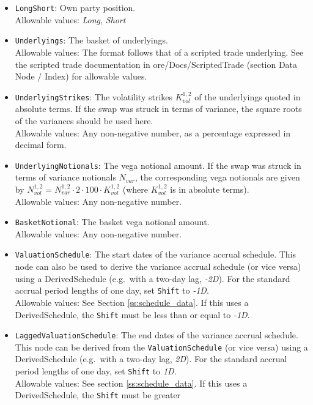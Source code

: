 \begin{itemize}
  \item \lstinline!LongShort!: Own party position. \\
    Allowable values: \emph{Long}, \emph{Short}
  \item \lstinline!Underlyings!: The basket of underlyings. \\
    Allowable values: The format follows that of a scripted trade underlying. See the scripted trade documentation in
    ore/Docs/ScriptedTrade (section Data Node / Index) for allowable values.
  \item \lstinline!UnderlyingStrikes!: The volatility strikes $K^{1,2}_{vol}$ of the underlyings quoted in absolute terms.
  If the swap was struck in terms of variance, the square roots of the variances should be used here. \\
    Allowable values: Any non-negative number, as a percentage expressed in decimal form.
  \item \lstinline!UnderlyingNotionals!: The vega notional amount. If the swap was struck in terms of variance notionals
  $N_{var}$, the corresponding vega notionals are given by $N^{1,2}_{vol} = N^{1,2}_{var} \cdot 2 \cdot 100 \cdot K^{1,2}_{vol}$
  (where $K^{1,2}_{vol}$ is in absolute terms). \\
    Allowable values: Any non-negative number. 
  \item{} \lstinline!BasketNotional!: The basket vega notional amount. \\
    Allowable values: Any non-negative number.
  \item{} \lstinline!ValuationSchedule!: The start dates of the variance accrual schedule. This node can
  also be used to derive the variance accrual schedule (or vice versa) using a DerivedSchedule (e.g.\ with a two-day lag, \emph{-2D}).
  For the standard accrual period lengths of one day, set \lstinline!Shift! to \emph{-1D}. \\
    Allowable values: See Section \ref{ss:schedule_data}. If this uses a DerivedSchedule, the \lstinline!Shift! must be less
  than or equal to \emph{-1D}.
  \item{} \lstinline!LaggedValuationSchedule!: The end dates of the variance accrual schedule. This node can be derived from
  the \lstinline!ValuationSchedule! (or vice versa) using a DerivedSchedule (e.g.\ with a two-day lag, \emph{2D}). For the standard
  accrual period lengths of one day, set \lstinline!Shift! to \emph{1D}. \\
    Allowable values: See section \ref{ss:schedule_data}. If this uses a DerivedSchedule, the \lstinline!Shift! must be greater

\end{itemize}
